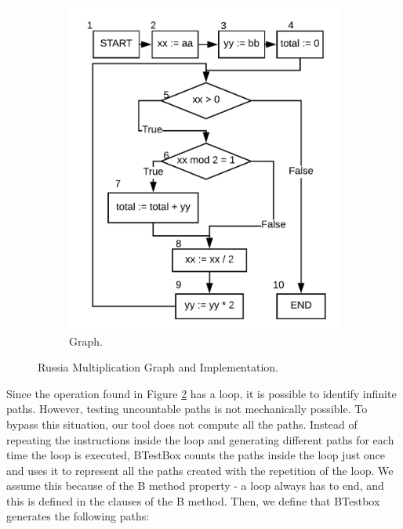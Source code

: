 \documentclass[runningheads]{llncs}
\begin{document}
\begin{figure}[ht]
\begin{minipage}{0.45\textwidth}
\begin{subfigure}{\textwidth}
\includegraphics[width = \textwidth]{imagens/lacoGrafo.png}
\caption{Graph.}
\label{fig:russianMultGraph}
\end{subfigure}
\end{minipage}
\caption{Russia Multiplication Graph and Implementation.}
\end{figure}

Since the operation found in Figure \ref{fig:russianMultGraph} has a loop, it is possible to identify infinite paths. However, testing uncountable paths is not mechanically possible.
To bypass this situation, our tool does not compute all the paths. Instead of repeating the instructions inside the loop and generating different paths for each time the loop is executed, BTestBox counts the paths inside the loop just once and uses it to represent all the paths created with the repetition of the loop. We assume this because of the B method property - a loop always has to end, and this is defined in the clauses of the B method. Then, we define that BTestbox generates the following paths:
\end{document}
